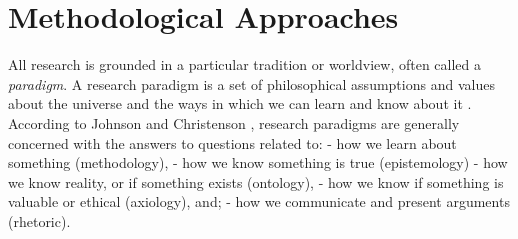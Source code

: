\documentclass[
]{book}
\begin{document}
\hypertarget{methodological-approaches}{%
\section{Methodological Approaches}\label{methodological-approaches}}

All research is grounded in a particular tradition or worldview, often called a \emph{paradigm}. A research paradigm is a set of philosophical assumptions and values about the universe and the ways in which we can learn and know about it \citep{johnsonEducationalResearchQuantitative2017}. According to Johnson and Christenson \citeyearpar{johnsonEducationalResearchQuantitative2017}, research paradigms are generally concerned with the answers to questions related to:
- how we learn about something (methodology),
- how we know something is true (epistemology)
- how we know reality, or if something exists (ontology),
- how we know if something is valuable or ethical (axiology), and;
- how we communicate and present arguments (rhetoric).
\end{document}
